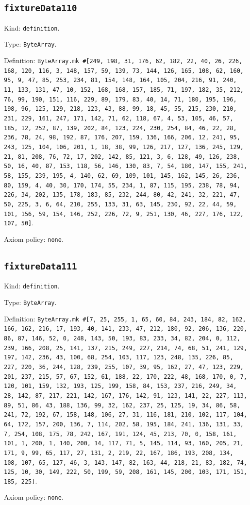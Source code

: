 \documentclass[11pt]{article}
\begin{document}
\subsection*{\texttt{fixtureData110}}
\noindent Kind: \texttt{definition}.\par
\noindent Type: \texttt{ByteArray}.\par
\noindent Definition: \texttt{ByteArray.mk \#[249, 198, 31, 176, 62, 182, 22, 40, 26, 226, 168, 120, 116, 3, 148, 157, 59, 139, 73, 144, 126, 165, 108, 62, 160, 95, 9, 47, 85, 253, 234, 81, 154, 148, 164, 105, 204, 216, 91, 240, 11, 133, 131, 47, 10, 152, 168, 168, 157, 185, 71, 197, 182, 35, 212, 76, 99, 190, 151, 116, 229, 89, 179, 83, 40, 14, 71, 180, 195, 196, 198, 96, 125, 129, 218, 123, 43, 88, 99, 18, 45, 55, 215, 230, 210, 231, 229, 161, 247, 171, 142, 71, 62, 118, 67, 4, 53, 105, 46, 57, 185, 12, 252, 87, 139, 202, 84, 123, 224, 230, 254, 84, 46, 22, 28, 236, 78, 24, 98, 192, 87, 176, 207, 159, 136, 166, 206, 12, 241, 95, 243, 125, 104, 106, 201, 1, 18, 38, 99, 126, 217, 127, 136, 245, 129, 21, 81, 208, 76, 72, 17, 202, 142, 85, 121, 3, 6, 128, 49, 126, 238, 50, 16, 40, 87, 153, 118, 56, 146, 130, 83, 7, 54, 180, 147, 155, 241, 58, 155, 239, 195, 4, 140, 62, 69, 109, 101, 145, 162, 145, 26, 236, 80, 159, 4, 40, 30, 170, 174, 55, 234, 1, 87, 115, 195, 238, 78, 94, 226, 34, 202, 135, 178, 183, 85, 232, 244, 80, 42, 241, 32, 221, 47, 50, 225, 3, 6, 64, 210, 255, 133, 31, 63, 145, 230, 92, 22, 44, 59, 101, 156, 59, 154, 146, 252, 226, 72, 9, 251, 130, 46, 227, 176, 122, 107, 50]}.\par
\noindent Axiom policy: \texttt{none}.\par
\subsection*{\texttt{fixtureData111}}
\noindent Kind: \texttt{definition}.\par
\noindent Type: \texttt{ByteArray}.\par
\noindent Definition: \texttt{ByteArray.mk \#[7, 25, 255, 1, 65, 60, 84, 243, 184, 82, 162, 166, 162, 216, 17, 193, 40, 141, 233, 47, 212, 180, 92, 206, 136, 220, 86, 87, 146, 52, 0, 248, 143, 50, 193, 83, 233, 34, 82, 204, 0, 112, 239, 166, 208, 25, 141, 137, 215, 249, 227, 214, 74, 68, 51, 241, 129, 197, 142, 236, 43, 100, 68, 254, 103, 117, 123, 248, 135, 226, 85, 227, 220, 36, 244, 128, 239, 255, 107, 39, 95, 162, 27, 47, 123, 229, 201, 237, 215, 57, 67, 152, 61, 188, 22, 170, 222, 48, 168, 170, 0, 7, 120, 101, 159, 132, 193, 125, 199, 158, 84, 153, 237, 216, 249, 34, 28, 142, 87, 217, 221, 142, 167, 176, 142, 91, 123, 141, 22, 227, 113, 89, 51, 86, 43, 188, 136, 99, 32, 162, 237, 25, 125, 19, 34, 86, 58, 241, 72, 192, 67, 158, 148, 106, 27, 31, 116, 181, 210, 102, 117, 104, 64, 172, 157, 200, 136, 7, 114, 202, 58, 195, 184, 241, 136, 131, 33, 7, 254, 108, 175, 78, 242, 167, 191, 124, 45, 213, 70, 0, 158, 161, 101, 1, 200, 1, 140, 200, 14, 117, 71, 5, 145, 114, 93, 160, 205, 21, 171, 9, 99, 65, 117, 27, 131, 2, 219, 22, 167, 186, 193, 208, 134, 108, 107, 65, 127, 46, 3, 143, 147, 82, 163, 44, 218, 21, 83, 182, 74, 125, 10, 30, 149, 222, 50, 199, 59, 208, 161, 145, 200, 103, 171, 151, 185, 225]}.\par
\noindent Axiom policy: \texttt{none}.\par
\end{document}
